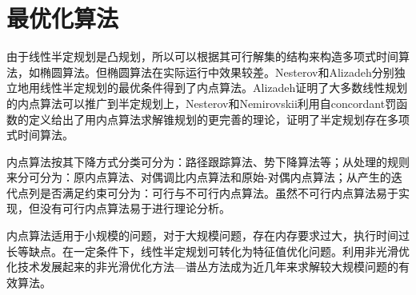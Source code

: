 \section{最优化算法}
    \par
    由于线性半定规划是凸规划，所以可以根据其可行解集的结构来构造多项式时间算法，如椭圆算法。但椭圆算法在实际运行中效果较差。Nesterov和Alizadeh分别独立地用线性半定规划的最优条件得到了内点算法。Alizadeh证明了大多数线性规划的内点算法可以推广到半定规划上，Nesterov和Nemirovskii利用自concordant罚函数的定义给出了用内点算法求解锥规划的更完善的理论，证明了半定规划存在多项式时间算法。
    \par
    内点算法按其下降方式分类可分为：路径跟踪算法、势下降算法等；从处理的规则来分可分为：原内点算法、对偶调比内点算法和原始-对偶内点算法；从产生的迭代点列是否满足约束可分为：可行与不可行内点算法。虽然不可行内点算法易于实现，但没有可行内点算法易于进行理论分析。
    \par
    内点算法适用于小规模的问题，对于大规模问题，存在内存要求过大，执行时间过长等缺点。在一定条件下，线性半定规划可转化为特征值优化问题。利用非光滑优化技术发展起来的非光滑优化方法—谱丛方法成为近几年来求解较大规模问题的有效算法。
